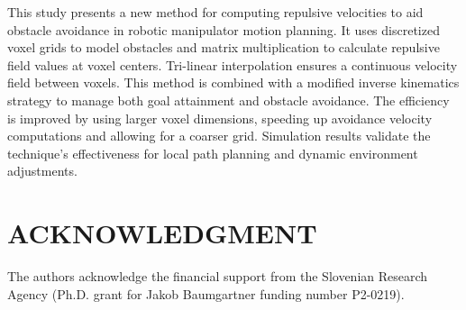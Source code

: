 \documentclass[letterpaper, 10 pt, conference]{ieeeconf}  %
\begin{document}
This study presents a new method for computing repulsive velocities to aid obstacle avoidance in robotic manipulator motion planning. It uses discretized voxel grids to model obstacles and matrix multiplication to calculate repulsive field values at voxel centers. Tri-linear interpolation ensures a continuous velocity field between voxels. This method is combined with a modified inverse kinematics strategy to manage both goal attainment and obstacle avoidance. The efficiency is improved by using larger voxel dimensions, speeding up avoidance velocity computations and allowing for a coarser grid. Simulation results validate the technique's effectiveness for local path planning and dynamic environment adjustments.



\section*{ACKNOWLEDGMENT}

The authors acknowledge the financial support from the Slovenian Research Agency (Ph.D. grant for Jakob Baumgartner funding number P2-0219).

\addtolength{\textheight}{-12cm}   %
\end{document}
